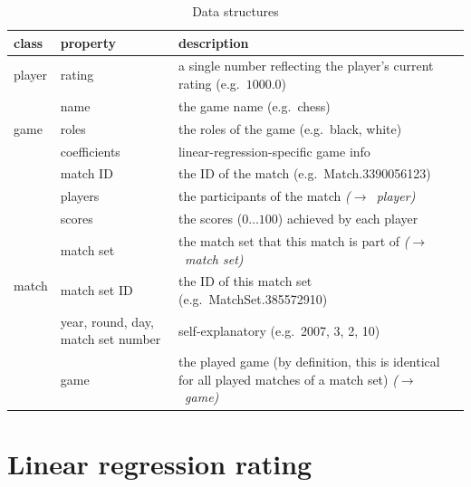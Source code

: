 \documentclass[a4paper,10pt]{article}
\begin{document}
\begin{table}
\begin{center}
\begin{tabular}{l m{2.8cm} m{6cm}}
\hline
\textbf{class} & \textbf{property} & \textbf{description} \\
\hline
player & rating & a single number reflecting the player's current rating (e.g.\ $1000.0$) \\ 
\hline
\multirow{3}{*}{game} & name & the game name (e.g.\ chess) \\ 
 & roles & the roles of the game (e.g.\ black, white) \\ 
 & coefficients &  linear-regression-specific game info \\
\hline
\multirow{7}{*}{match} & match ID & the ID of the match (e.g.\ Match.3390056123) \\ 
 & players & the participants of the match \textit{($\rightarrow$~player)} \\ 
 & scores & the scores ($0 \dotsc 100$) achieved by each player\\ 
 & match set & the match set that this match is part of \textit{($\rightarrow$~match set)} \\ 
\hline
\multirow{6}{*}{match set} & match set ID & the ID of this match set (e.g.\ MatchSet.385572910) \\ 
 & year, round, day, match set number & self-explanatory (e.g.\ 2007, 3, 2, 10) \\ 
 & game & the played game (by definition, this is identical for all played matches of a match set) \textit{($\rightarrow$~game)} \\
\hline
\end{tabular}
\end{center}
\caption{Data structures}
\label{tab:data_structures}
\end{table} 

\section{Linear regression rating}
\end{document}
